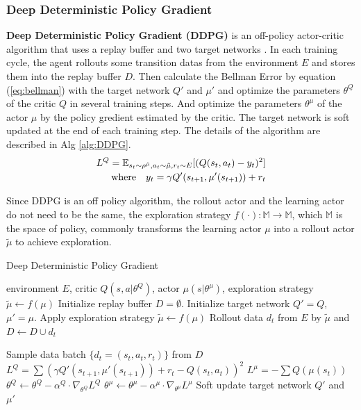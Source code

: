 \subsubsection{Deep Deterministic Policy Gradient}
\textbf{Deep Deterministic Policy Gradient (DDPG)} is an off-policy actor-critic algorithm that uses a replay buffer and two target networks \cite{DDPG}. In each training cycle, the agent rollouts some  transition datas from the environment $E$ and stores them into the replay buffer $D$. Then calculate the Bellman Error by equation (\ref{eq:bellman}) with the target network $Q'$ and $\mu'$ and optimize the parameters $\theta^{Q}$ of the critic $Q$ in several training steps. And optimize the parameters $\theta^{\mu}$ of the actor $\mu$ by the policy gredient estimated by the critic. The target network is soft updated at the end of each training step. The details of the algorithm are described in Alg \ref{alg:DDPG}.
\begin{equation}
   \label{eq:bellman} 
   \begin{aligned}
   L^Q=\mathbb{E}_{s_t\sim\rho^{\tilde\mu},a_t\sim\tilde\mu,r_t\sim E}[(Q(s_t,a_t)-y_t)^2]\\
   \text{where\quad}  y_t = \gamma Q'(s_{t+1},\mu'(s_{t+1}))+r_t
   \end{aligned}
\end{equation}

Since DDPG is an off policy algorithm, the rollout actor and the learning actor do not need to be the same, the exploration strategy $f(\cdot) : \mathbb{M} \rightarrow \mathbb{M}$, which $\mathbb{M}$ is the space of policy, commonly transforms the learning actor $\mu$ into a rollout actor $\tilde\mu$ to achieve exploration.

\begin{algorithm}[htbp]
   \caption{Deep Deterministic Policy Gradient}
   \label{alg:DDPG}
\begin{algorithmic}
    environment $E$, critic $Q(s,a|\theta^Q)$, actor $\mu(s|\theta^\mu)$, exploration strategy $\tilde\mu \leftarrow f(\mu)$
   \STATE Initialize replay buffer $D = \emptyset$.
   \STATE Initialize target network $Q'= Q$, $\mu'= \mu$.
   \STATE Apply exploration strategy $\tilde\mu \leftarrow f(\mu)$
   \STATE Rollout data $d_t$ from $E$ by $\tilde\mu$ and $D \leftarrow D\cup {d_t}$

   \STATE Sample data batch $\{d_t=(s_t,a_t,r_t)\}$ from $D$
   \STATE $L^Q=\sum(\gamma Q'(s_{t+1},\mu'(s_{t+1}))+r_t-Q(s_t,a_t))^2$
   \STATE $L^\mu=-\sum Q(\mu(s_t))$
   \STATE $\theta^Q \leftarrow \theta^Q - \alpha^Q\cdot\nabla_{\theta^Q} L^Q$
   \STATE $\theta^\mu \leftarrow \theta^\mu -\alpha^\mu\cdot\nabla_{\theta^\mu} L^\mu$
   \STATE Soft update target network $Q'$ and $\mu'$
   \ENDFOR
   \ENDFOR
\end{algorithmic}
\end{algorithm}

